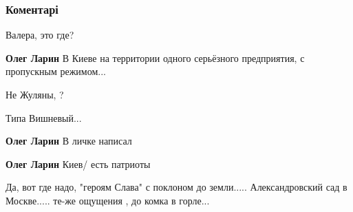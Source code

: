  
 
 
 
 
\subsubsection{Коментарі}

\begin{itemize} %
Валера, это где?

\textbf{Олег Ларин} В Киеве на территории одного серьёзного предприятия, с пропускным режимом...

Не Жуляны, ?

Типа Вишневый...

\textbf{Олег Ларин} В личке написал

\textbf{Олег Ларин} Киев/ есть патриоты

Да, вот где надо, "героям Слава" с поклоном до земли..... Александровский сад в Москве..... те-же ощущения , до комка в горле...
\end{itemize} %
